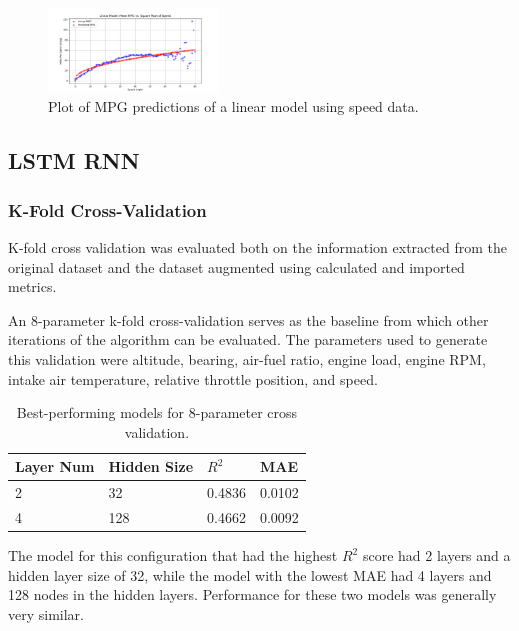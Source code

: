 \documentclass[letterpaper]{article}
\begin{document}
\begin{figure}[htbp]
    \centering
    \includegraphics[width=0.4\textwidth]{figures/speed_vs_mpg_linear_model.png}
    \caption{Plot of MPG predictions of a linear model using speed data.}
    \label{fig:speedvsmpglinear}
\end{figure}


\subsection*{LSTM RNN}

\subsubsection*{K-Fold Cross-Validation}

K-fold cross validation was evaluated both on the information extracted 
from the original dataset and the dataset augmented using calculated and 
imported metrics.

An 8-parameter k-fold cross-validation serves as the baseline from which 
other iterations of the algorithm can be evaluated. The parameters used to 
generate this validation were altitude, bearing, air-fuel ratio, engine 
load, engine RPM, intake air temperature, relative throttle position, and 
speed.

\begin{table}[]
    \begin{tabular}{|l|l|l|l|}
        \hline
        \textbf{Layer Num} & \textbf{Hidden Size} & \textbf{$R^{2}$} & \textbf{MAE} \\
        \hline
        2                  & 32                   & 0.4836      & 0.0102       \\
        4                  & 128                  & 0.4662      & 0.0092       \\
        \hline
    \end{tabular}
    \caption{Best-performing models for 8-parameter cross validation.}
    \label{tab:tb1}
\end{table}

The model for this configuration that had the highest $R^{2}$ score had 2 
layers and a hidden layer size of 32, while the model with the lowest MAE 
had 4 layers and 128 nodes in the hidden layers. Performance for these two 
models was generally very similar.
\end{document}

